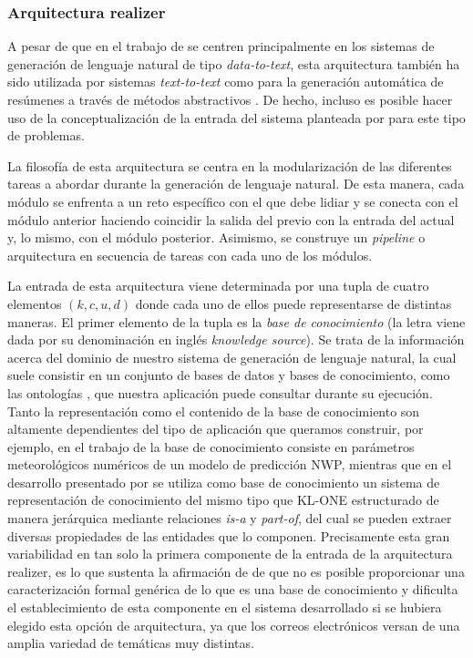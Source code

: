 \subsubsection{Arquitectura realizer}\label{sss:realizer}
A pesar de que en el trabajo de \cite{biblia} se centren principalmente en los sistemas de generación de lenguaje natural de tipo \textit{data-to-text}, esta arquitectura también ha sido utilizada por sistemas \textit{text-to-text} como para la generación automática de resúmenes a través de métodos abstractivos \citep{genest2011framework}. De hecho, incluso es posible hacer uso de la conceptualización de la entrada del sistema planteada por \cite{biblia} para este tipo de problemas.

La filosofía de esta arquitectura se centra en la modularización de las diferentes tareas a abordar durante la generación de lenguaje natural. De esta manera, cada módulo se enfrenta a un reto específico con el que debe lidiar y se conecta con el módulo anterior haciendo coincidir la salida del previo con la entrada del actual y, lo mismo, con el módulo posterior. Asimismo, se construye un \textit{pipeline} o arquitectura en secuencia de tareas con cada uno de los módulos.

La entrada de esta arquitectura viene determinada por una tupla de cuatro elementos $(k, c, u, d)$ donde cada uno de ellos puede representarse de distintas maneras. El primer elemento de la tupla es la \textit{base de conocimiento} (la letra viene dada por su denominación en inglés \textit{knowledge source}). Se trata de la información acerca del dominio de nuestro sistema de generación de lenguaje natural, la cual suele consistir en un conjunto de bases de datos y bases de conocimiento, como las ontologías \citep{fensel2001ontologies}, que nuestra aplicación puede consultar durante su ejecución. Tanto la representación como el contenido de la base de conocimiento son altamente dependientes del tipo de aplicación que queramos construir, por ejemplo, en el trabajo de \cite{reiter2005choosing} la base de conocimiento consiste en parámetros meteorológicos numéricos de un modelo de predicción NWP, mientras que en el desarrollo presentado por \cite{reiter1995automatic} se utiliza como base de conocimiento un sistema de representación de conocimiento del mismo tipo que KL-ONE \citep{brachman1989overview} estructurado de manera jerárquica mediante relaciones \textit{is-a} y \textit{part-of}, del cual se pueden extraer diversas propiedades de las entidades que lo componen. Precisamente esta gran variabilidad en tan solo la primera componente de la entrada de la arquitectura realizer, es lo que sustenta la afirmación de \cite{biblia} de que no es posible proporcionar una caracterización formal genérica de lo que es una base de conocimiento y dificulta el establecimiento de esta componente en el sistema desarrollado si se hubiera elegido esta opción de arquitectura, ya que los correos electrónicos versan de una amplia variedad de temáticas muy distintas.

